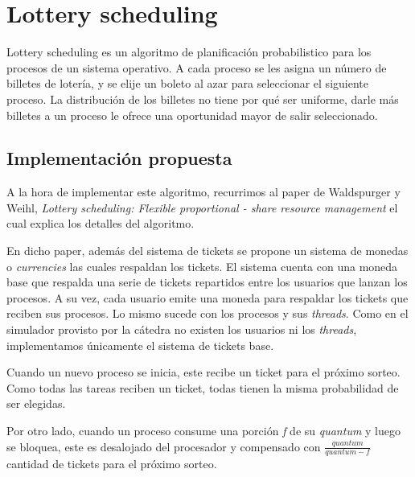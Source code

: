 \section{Lottery scheduling}
Lottery scheduling es un algoritmo de planificaci\'on probabilistico para los procesos de un sistema operativo. A cada proceso se les asigna un n\'umero de billetes de loter\'ia, y se elije un boleto al azar para seleccionar el siguiente proceso. La distribución de los billetes no tiene por qu\'e ser uniforme, darle más billetes a un proceso le ofrece una oportunidad mayor de salir seleccionado.

\subsection{Implementaci\'on propuesta}
A la hora de implementar este algoritmo, recurrimos al paper de Waldspurger y Weihl, \textit{Lottery scheduling: Flexible proportional - share resource management} el cual explica los detalles del algoritmo. 

En dicho paper, adem\'as del sistema de tickets se propone un sistema de monedas o \textit{currencies} las cuales respaldan los tickets. El sistema cuenta con una moneda base que respalda una serie de tickets repartidos entre los usuarios que lanzan los procesos. A su vez, cada usuario emite una moneda para respaldar los tickets que reciben sus procesos. Lo mismo sucede con los procesos y sus \textit{threads}. Como en el simulador provisto por la c\'atedra no existen los usuarios ni los \textit{threads}, implementamos \'unicamente el sistema de tickets base.

Cuando un nuevo proceso se inicia, este recibe un ticket para el pr\'oximo sorteo. Como todas las tareas reciben un ticket, todas tienen la misma probabilidad de ser elegidas.

Por otro lado, cuando un proceso consume una porci\'on \textit{f} de su \textit{quantum} y luego se bloquea, este es desalojado del procesador y compensado con $\frac{quantum}{quantum - f}$ cantidad de tickets para el pr\'oximo sorteo. 